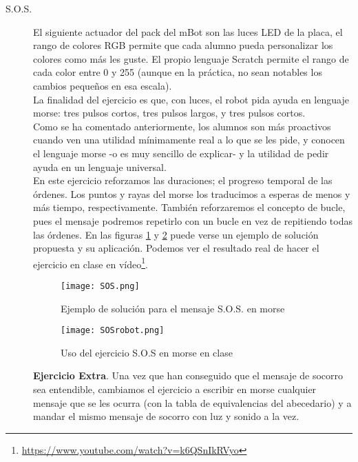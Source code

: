 \begin{description}
\item [S.O.S.]\label{ej:sos}
El siguiente actuador del pack del mBot son las luces LED de la placa, el rango de colores RGB permite que cada alumno pueda personalizar los colores como más les guste. El propio lenguaje Scratch permite el rango de cada color entre 0 y 255 (aunque en la práctica, no sean notables los cambios pequeños en esa escala).\\
La finalidad del ejercicio es que, con luces, el robot pida ayuda en lenguaje morse: tres pulsos cortos, tres pulsos largos, y tres pulsos cortos. \\
Como se ha comentado anteriormente, los alumnos son más proactivos cuando ven una utilidad mínimamente real a lo que se les pide, y conocen el lenguaje morse -o es muy sencillo de explicar- y la utilidad de pedir ayuda en un lenguaje universal.\\
En este ejercicio reforzamos las duraciones; el progreso temporal de las órdenes. Los puntos y rayas del morse los traducimos a esperas de menos y más tiempo, respectivamente. También reforzaremos el concepto de bucle, pues el mensaje podremos repetirlo con un bucle en vez de repitiendo todas las órdenes.  En las figuras \ref{img:SOS} y \ref{img:SOSrobot} puede verse un ejemplo de solución propuesta y su aplicación. Podemos ver el resultado real de hacer el ejercicio en clase en vídeo\footnote{\href{https://www.youtube.com/watch?v=k6QSnIkRVyo}{https://www.youtube.com/watch?v=k6QSnIkRVyo}}. \\
\begin{figure}[h]
	\centering
	\texttt{[image: SOS.png]}	
	\caption{Ejemplo de solución para el mensaje S.O.S. en morse}
	\label{img:SOS}
\end{figure}
\begin{figure}[h]
	\centering
	\texttt{[image: SOSrobot.png]}	
	\caption{Uso del ejercicio S.O.S en morse en clase}
	\label{img:SOSrobot}
\end{figure}
\textbf{Ejercicio Extra}. Una vez que han conseguido que el mensaje de socorro sea entendible, cambiamos el ejercicio a escribir en morse cualquier mensaje que se les ocurra (con la tabla de equivalencias del abecedario) y a mandar el mismo mensaje de socorro con luz y sonido a la vez.


\end{description}
